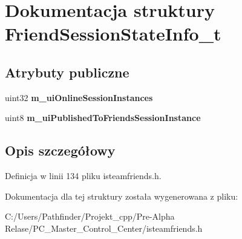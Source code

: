 \hypertarget{struct_friend_session_state_info__t}{}\section{Dokumentacja struktury Friend\+Session\+State\+Info\+\_\+t}
\label{struct_friend_session_state_info__t}
\subsection*{Atrybuty publiczne}
\begin{DoxyCompactItemize}
\item 
\mbox{\label{struct_friend_session_state_info__t_a696907815ec478b5f156089c3e516385}} 
uint32 {\bfseries m\+\_\+ui\+Online\+Session\+Instances}
\item 
\mbox{\label{struct_friend_session_state_info__t_a3754f1f10a4f312f44887c07106f0eda}} 
uint8 {\bfseries m\+\_\+ui\+Published\+To\+Friends\+Session\+Instance}
\end{DoxyCompactItemize}


\subsection{Opis szczegółowy}


Definicja w linii 134 pliku isteamfriends.\+h.



Dokumentacja dla tej struktury została wygenerowana z pliku\+:\begin{DoxyCompactItemize}
\item 
C\+:/\+Users/\+Pathfinder/\+Projekt\+\_\+cpp/\+Pre-\/\+Alpha Relase/\+P\+C\+\_\+\+Master\+\_\+\+Control\+\_\+\+Center/isteamfriends.\+h\end{DoxyCompactItemize}
